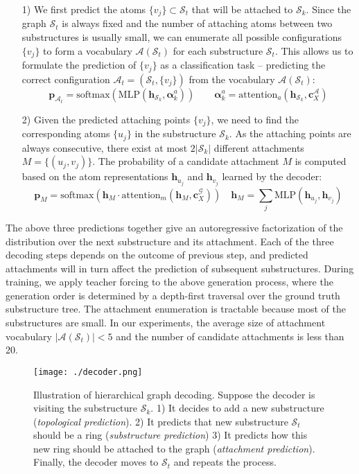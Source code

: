 \documentclass{article} \usepackage{iclr2020_conference,times}
\newcommand{\graph}{\mathcal{G}}
\newcommand{\MLP}{\mathrm{MLP}}
\newcommand{\attention}{\mathrm{attention}}
\newcommand{\set}[1]{\{ #1 \}}
\def\valpha{{\bm{\alpha}}}
\def\vc{{\bm{c}}}
\def\vh{{\bm{h}}}
\def\vp{{\bm{p}}}
\def\gA{{\mathcal{A}}}
\def\gS{{\mathcal{S}}}
\newcommand{\softmax}{\mathrm{softmax}}
\begin{document}
\begin{enumerate}[leftmargin=*,topsep=0pt,itemsep=0pt]
    \begin{enumerate}[leftmargin=*,topsep=0pt,itemsep=0pt] 
        \item[1)] We first predict the atoms $\set{v_j} \subset \gS_t$ that will be attached to $\gS_k$. Since the graph $\gS_t$ is always fixed and the number of attaching atoms between two substructures is usually small, we can enumerate all possible configurations $\set{v_j}$ to form a vocabulary $\gA(\gS_t)$ for each substructure $\gS_t$. This allows us to formulate the prediction of $\set{v_j}$ as a classification task --  predicting the correct configuration $\gA_t=(\gS_t,\set{v_j})$ from the vocabulary $\gA(\gS_t)$:
        \begin{equation}
            \vp_{\gA_t} = \softmax(\MLP(\vh_{\gS_k}, \valpha_k^a)) \qquad \valpha_k^a = \attention_a\left( \vh_{\gS_k}, \vc_X^\gA \right)
        \end{equation}
        \item[2)] Given the predicted attaching points $\set{v_j}$, we need to find the corresponding atoms $\set{u_j}$ in the substructure $\gS_k$. As the attaching points are always consecutive, there exist at most $2|\gS_k|$ different attachments $M=\set{(u_j,v_j)}$. The probability of a candidate attachment $M$ is computed based on the atom representations $\vh_{u_j}$ and $\vh_{v_j}$ learned by the decoder:
        \begin{equation}
            \vp_M = \softmax\left(\vh_M \cdot \attention_m(\vh_M, \vc_X^\graph)\right) \quad
            \vh_M = \sum_j\nolimits \MLP(\vh_{u_j},\vh_{v_j})
        \end{equation}
    \end{enumerate}
\end{enumerate}
The above three predictions together give an autoregressive factorization of the distribution over the next substructure and its attachment. Each of the three decoding steps depends on the outcome of previous step, and predicted attachments will in turn affect the prediction of subsequent substructures.
During training, we apply teacher forcing to the above generation process, where the generation order is determined by a depth-first traversal over the ground truth substructure tree.
The attachment enumeration is tractable because most of the substructures are small. In our experiments, the average size of attachment vocabulary $|\gA(\gS_t)| < 5$ and the number of candidate attachments is less than 20.


\begin{figure}[t]
    \centering
    \texttt{[image: ./decoder.png]}
    \caption{Illustration of hierarchical graph decoding. Suppose the decoder is visiting the substructure $\gS_k$. 1) It decides to add a new substructure (\emph{topological prediction}). 2) It predicts that new substructure $\gS_t$ should be a ring (\emph{substructure prediction}) 3) It predicts how this new ring should be attached to the graph (\emph{attachment prediction}). Finally, the decoder moves to $\gS_t$ and repeats the process.}
    \label{fig:decoder}
\end{figure}
\end{document}
